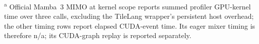 \par\smallskip
\noindent\begin{minipage}{\linewidth}\footnotesize
\textsuperscript{a} Official Mamba~3 MIMO at kernel scope reports summed profiler GPU-kernel
time over three calls, excluding the TileLang wrapper's persistent host overhead;
the other timing rows report elapsed CUDA-event time. Its eager mixer timing is
therefore n/a; its CUDA-graph replay is reported separately.
\end{minipage}
